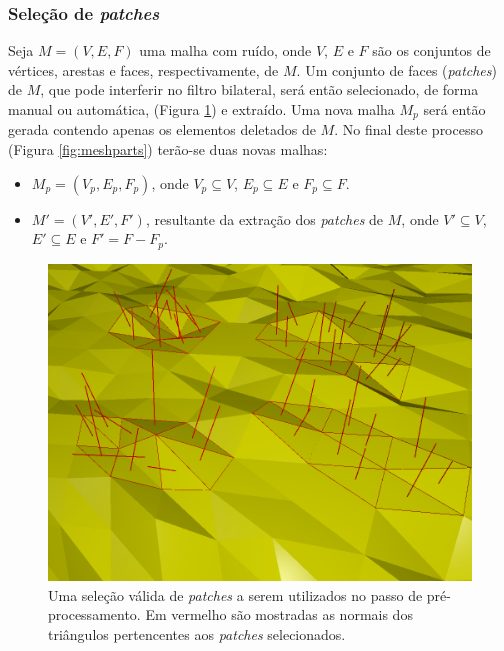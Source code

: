 \subsubsection{Seleção de \textit{patches}}

Seja $M = (V,E,F)$ uma malha com ruído, onde $V$, $E$ e $F$ são os conjuntos de vértices, arestas e faces, respectivamente, de $M$. Um conjunto de faces (\textit{patches}) de $M$, que pode interferir no filtro bilateral, será então selecionado, de forma manual ou automática, (Figura \ref{fig:validselection}) e extraído. Uma nova malha $M_p$ será então gerada contendo apenas os elementos deletados de $M$. No final deste processo (Figura \ref{fig:meshparts}) terão-se duas novas malhas: 

\begin{itemize}  
\item $M_p = (V_p,E_p,F_p)$, onde $V_p \subseteq V$, $E_p \subseteq E$ e $F_p \subseteq F$.
\item $M' = (V', E', F')$, resultante da extração dos \textit{patches} de $M$, onde $V' \subseteq V$, $E' \subseteq E$ e $F' = F - F_p$.
\end{itemize}


\begin{figure}[!h]
\captionsetup{width=\linewidth}
\centering
\includegraphics[scale=0.30]{figuras/validselection.png}
\caption{Uma seleção válida de \textit{patches} a serem utilizados no passo de pré-processamento. Em vermelho são mostradas as normais dos triângulos pertencentes aos \textit{patches} selecionados.}
\label{fig:validselection}
\end{figure}


